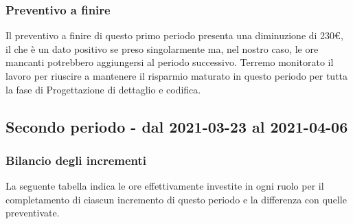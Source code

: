 {{{{{{{{	
\subsubsection{Preventivo a finire}\label{ConsuntivoPrimoPeriodoDiProgettazioneDiDettaglioCodificaPreventivoFinire}
	Il preventivo a finire di questo primo periodo presenta una diminuzione di 230\euro, il che è un dato positivo se preso singolarmente ma, nel nostro caso, le ore mancanti potrebbero aggiungersi al periodo successivo. Terremo monitorato il lavoro per riuscire a mantenere il risparmio maturato in questo periodo per tutta la fase di Progettazione di dettaglio e codifica.
	
\subsection{Secondo periodo - dal 2021-03-23 al 2021-04-06 }\label{ConsuntivoSecondoPeriodoDiProgettazioneDiDettaglioCodifica}
	
\subsubsection{Bilancio degli incrementi}\label{ConsuntivoSecondoPeriodoDiProgettazioneDiDettaglioCodificaIncrementi}
	
	La seguente tabella indica le ore effettivamente investite in ogni ruolo per il completamento di ciascun incremento di questo periodo e la differenza con quelle preventivate.

\quad
\def\tabularxcolumn#1{m{#1}}
{
	
}}}}}}}}}
